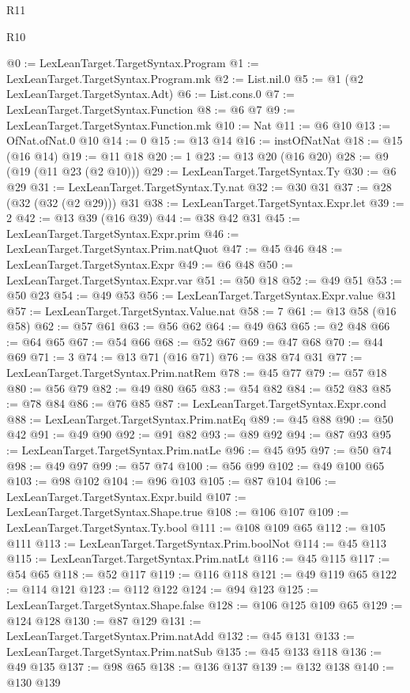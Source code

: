\begin{lexlean}{R11}
\begin{lexlean}{R10}
\begin{coremodule}
{{{{{@0 := LexLeanTarget.TargetSyntax.Program
@1 := LexLeanTarget.TargetSyntax.Program.mk
@2 := List.nil.{0}
@5 := @1 (@2 LexLeanTarget.TargetSyntax.Adt)
@6 := List.cons.{0}
@7 := LexLeanTarget.TargetSyntax.Function
@8 := @6 @7
@9 := LexLeanTarget.TargetSyntax.Function.mk
@10 := Nat
@11 := @6 @10
@13 := OfNat.ofNat.{0} @10
@14 := 0
@15 := @13 @14
@16 := instOfNatNat
@18 := @15 (@16 @14)
@19 := @11 @18
@20 := 1
@23 := @13 @20 (@16 @20)
@28 := @9 (@19 (@11 @23 (@2 @10)))
@29 := LexLeanTarget.TargetSyntax.Ty
@30 := @6 @29
@31 := LexLeanTarget.TargetSyntax.Ty.nat
@32 := @30 @31
@37 := @28 (@32 (@32 (@2 @29))) @31
@38 := LexLeanTarget.TargetSyntax.Expr.let
@39 := 2
@42 := @13 @39 (@16 @39)
@44 := @38 @42 @31
@45 := LexLeanTarget.TargetSyntax.Expr.prim
@46 := LexLeanTarget.TargetSyntax.Prim.natQuot
@47 := @45 @46
@48 := LexLeanTarget.TargetSyntax.Expr
@49 := @6 @48
@50 := LexLeanTarget.TargetSyntax.Expr.var
@51 := @50 @18
@52 := @49 @51
@53 := @50 @23
@54 := @49 @53
@56 := LexLeanTarget.TargetSyntax.Expr.value @31
@57 := LexLeanTarget.TargetSyntax.Value.nat
@58 := 7
@61 := @13 @58 (@16 @58)
@62 := @57 @61
@63 := @56 @62
@64 := @49 @63
@65 := @2 @48
@66 := @64 @65
@67 := @54 @66
@68 := @52 @67
@69 := @47 @68
@70 := @44 @69
@71 := 3
@74 := @13 @71 (@16 @71)
@76 := @38 @74 @31
@77 := LexLeanTarget.TargetSyntax.Prim.natRem
@78 := @45 @77
@79 := @57 @18
@80 := @56 @79
@82 := @49 @80 @65
@83 := @54 @82
@84 := @52 @83
@85 := @78 @84
@86 := @76 @85
@87 := LexLeanTarget.TargetSyntax.Expr.cond
@88 := LexLeanTarget.TargetSyntax.Prim.natEq
@89 := @45 @88
@90 := @50 @42
@91 := @49 @90
@92 := @91 @82
@93 := @89 @92
@94 := @87 @93
@95 := LexLeanTarget.TargetSyntax.Prim.natLe
@96 := @45 @95
@97 := @50 @74
@98 := @49 @97
@99 := @57 @74
@100 := @56 @99
@102 := @49 @100 @65
@103 := @98 @102
@104 := @96 @103
@105 := @87 @104
@106 := LexLeanTarget.TargetSyntax.Expr.build
@107 := LexLeanTarget.TargetSyntax.Shape.true
@108 := @106 @107
@109 := LexLeanTarget.TargetSyntax.Ty.bool
@111 := @108 @109 @65
@112 := @105 @111
@113 := LexLeanTarget.TargetSyntax.Prim.boolNot
@114 := @45 @113
@115 := LexLeanTarget.TargetSyntax.Prim.natLt
@116 := @45 @115
@117 := @54 @65
@118 := @52 @117
@119 := @116 @118
@121 := @49 @119 @65
@122 := @114 @121
@123 := @112 @122
@124 := @94 @123
@125 := LexLeanTarget.TargetSyntax.Shape.false
@128 := @106 @125 @109 @65
@129 := @124 @128
@130 := @87 @129
@131 := LexLeanTarget.TargetSyntax.Prim.natAdd
@132 := @45 @131
@133 := LexLeanTarget.TargetSyntax.Prim.natSub
@135 := @45 @133 @118
@136 := @49 @135
@137 := @98 @65
@138 := @136 @137
@139 := @132 @138
@140 := @130 @139
}}}}}
\end{coremodule}
\end{lexlean}
\end{lexlean}
